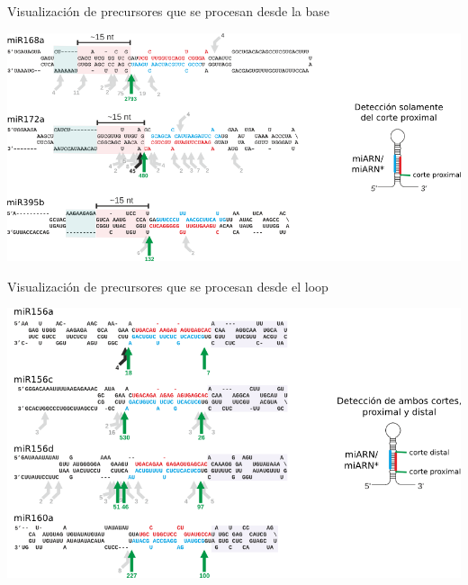 \documentclass{beamer}
\begin{document}
\begin{frame}{Visualización de precursores que se procesan desde la base}
	\begin{center}
		\includegraphics[width=.8\textwidth]{img/GR_fig2A.png}
	\end{center}
\end{frame}

\begin{frame}{Visualización de precursores que se procesan desde el loop}
	\begin{center}
		\includegraphics[width=.8\textwidth]{img/GR_fig4A.png}
	\end{center}
\end{frame}
\end{document}
